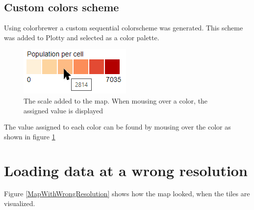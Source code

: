 

\subsection{Custom colors scheme}
Using colorbrewer a custom sequential colorscheme was generated. This scheme was added to Plotty and selected as a color palette. 

\begin{figure} [H]
	\centering
	\includegraphics[width=.8\textwidth]{Pictures/CScale}
	\caption{The scale added to the map. When mousing over a color, the assigned value is displayed}
	\label{CScale}
\end{figure}

The value assigned to each color can be found by mousing over the color as shown in figure \ref{CScale}


\section{Loading data at a wrong resolution}\label{PresentingBug}

Figure \ref{MapWithWrongResolution} shows how the map looked, when the tiles are visualized. 

